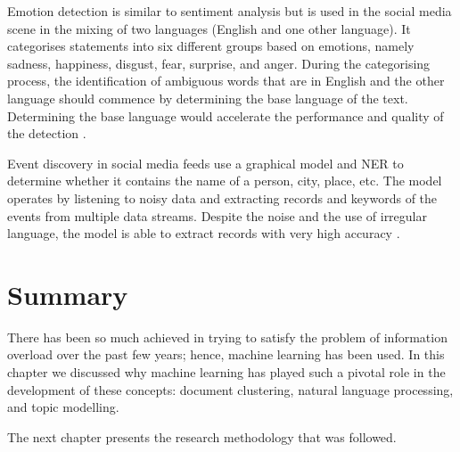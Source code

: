 Emotion detection is similar to sentiment analysis but is used in the social media scene in the mixing of two languages (English and one other language). It categorises statements into six different groups based on emotions, namely sadness, happiness, disgust, fear, surprise, and anger. During the categorising process, the identification of ambiguous words that are in English and the other language should commence by determining the base language of the text. Determining the base language would accelerate the performance and quality of the detection \cite{khurana2017natural}.

Event discovery in social media feeds use a graphical model and NER to determine whether it contains the name of a person, city, place, etc. The model operates by listening to noisy data and extracting records and keywords of the events from multiple data streams. Despite the noise and the use of irregular language, the model is able to extract records with very high accuracy \cite{benson2011event}.

\section{Summary}

There has been so much achieved in trying to satisfy the problem of information overload over the past few years; hence, machine learning has been used.
In this chapter we discussed why machine learning has played such a pivotal role in the development of these concepts: document clustering, natural language processing, and topic modelling.

The next chapter presents the research methodology that was followed.
